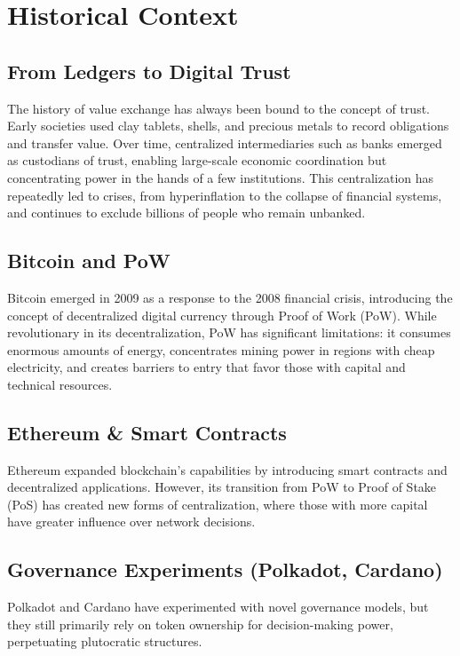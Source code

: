 \documentclass[11pt,a4paper]{article}
\begin{document}
\section{Historical Context}

\subsection{From Ledgers to Digital Trust}
The history of value exchange has always been bound to the concept of trust. Early societies used clay tablets, shells, and precious metals to record obligations and transfer value. Over time, centralized intermediaries such as banks emerged as custodians of trust, enabling large-scale economic coordination but concentrating power in the hands of a few institutions. This centralization has repeatedly led to crises, from hyperinflation to the collapse of financial systems, and continues to exclude billions of people who remain unbanked.

\subsection{Bitcoin and PoW}
Bitcoin emerged in 2009 as a response to the 2008 financial crisis, introducing the concept of decentralized digital currency through Proof of Work (PoW). While revolutionary in its decentralization, PoW has significant limitations: it consumes enormous amounts of energy, concentrates mining power in regions with cheap electricity, and creates barriers to entry that favor those with capital and technical resources.

\subsection{Ethereum \& Smart Contracts}
Ethereum expanded blockchain's capabilities by introducing smart contracts and decentralized applications. However, its transition from PoW to Proof of Stake (PoS) has created new forms of centralization, where those with more capital have greater influence over network decisions.

\subsection{Governance Experiments (Polkadot, Cardano)}
Polkadot and Cardano have experimented with novel governance models, but they still primarily rely on token ownership for decision-making power, perpetuating plutocratic structures.
\end{document}
